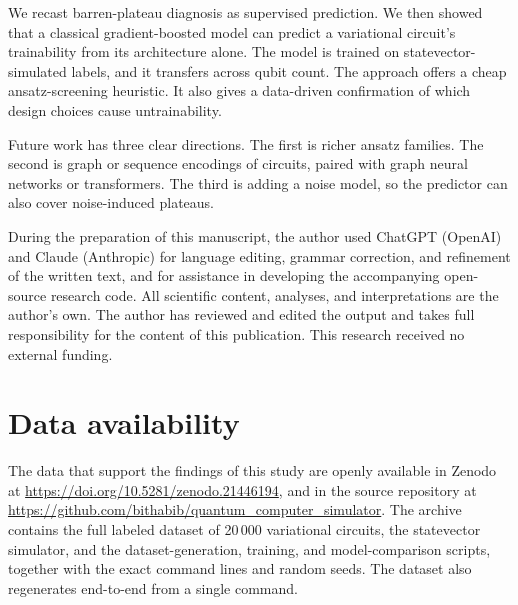 \documentclass[aps,pra,preprint,amsmath,amssymb,floatfix,nofootinbib]{revtex4-2}
\newcommand{\Nrows}{20\,000}
\begin{document}
We recast barren-plateau diagnosis as supervised prediction. We then showed that
a classical gradient-boosted model can predict a variational circuit's
trainability from its architecture alone. The model is trained on
statevector-simulated labels, and it transfers across qubit count. The approach
offers a cheap ansatz-screening heuristic. It also gives a data-driven
confirmation of which design choices cause untrainability.

Future work has three clear directions. The first is richer ansatz families. The
second is graph or sequence encodings of circuits, paired with graph neural
networks or transformers. The third is adding a noise model, so the predictor can
also cover noise-induced plateaus.

\begin{acknowledgments}
During the preparation of this manuscript, the author used ChatGPT (OpenAI) and
Claude (Anthropic) for language editing, grammar correction, and refinement of
the written text, and for assistance in developing the accompanying open-source
research code. All scientific content, analyses, and interpretations are the
author's own. The author has reviewed and edited the output and takes full
responsibility for the content of this publication. This research received no
external funding.
\end{acknowledgments}

\section*{Data availability}
The data that support the findings of this study are openly available in Zenodo
at \url{https://doi.org/10.5281/zenodo.21446194}, and in the source repository at
\url{https://github.com/bithabib/quantum_computer_simulator}. The archive
contains the full labeled dataset of \Nrows{} variational circuits, the
statevector simulator, and the dataset-generation, training, and model-comparison
scripts, together with the exact command lines and random seeds. The dataset also
regenerates end-to-end from a single command.


\end{document}
